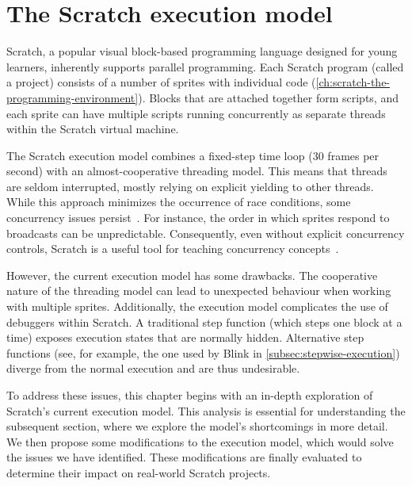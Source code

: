 \documentclass[../main]{subfiles}
\begin{document}
\chapter{The Scratch execution model}\label{ch:scratch-execution-model}


Scratch, a popular visual block-based programming language designed for young learners, inherently supports parallel programming.
Each Scratch program (called a project) consists of a number of sprites with individual code (\cref{ch:scratch-the-programming-environment}).
Blocks that are attached together form scripts, and each sprite can have multiple scripts running concurrently as separate threads within the Scratch virtual machine.

The Scratch execution model combines a fixed-step time loop (30 frames per second) with an almost-cooperative threading model.
This means that threads are seldom interrupted, mostly relying on explicit yielding to other threads.
While this approach minimizes the occurrence of race conditions, some concurrency issues persist~\autocite{maloneyScratchProgrammingLanguage2010}.
For instance, the order in which sprites respond to broadcasts can be unpredictable.
Consequently, even without explicit concurrency controls, Scratch is a useful tool for teaching concurrency concepts~\autocite{fatourouTeachingConcurrentProgramming2018}.

However, the current execution model has some drawbacks.
The cooperative nature of the threading model can lead to unexpected behaviour when working with multiple sprites.
Additionally, the execution model complicates the use of debuggers within Scratch.
A traditional step function (which steps one block at a time) exposes execution states that are normally hidden.
Alternative step functions (see, for example, the one used by Blink in \cref{subsec:stepwise-execution}) diverge from the normal execution and are thus undesirable.

To address these issues, this chapter begins with an in-depth exploration of Scratch's current execution model.
This analysis is essential for understanding the subsequent section, where we explore the model's shortcomings in more detail.
We then propose some modifications to the execution model, which would solve the issues we have identified.
These modifications are finally evaluated to determine their impact on real-world Scratch projects.
\end{document}
